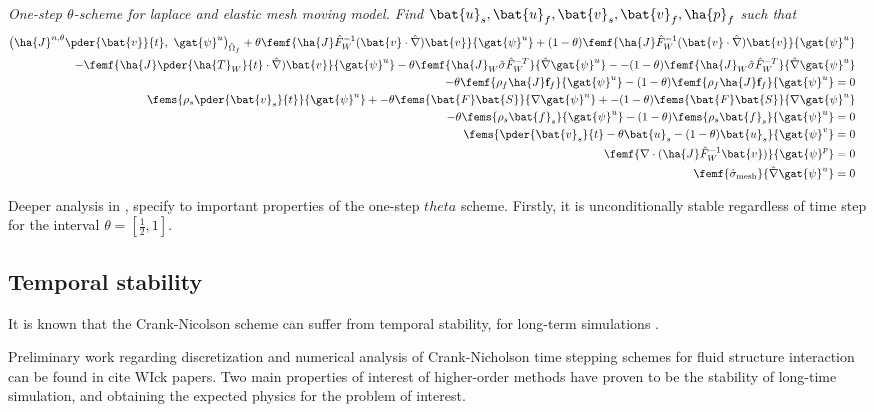 \begin{prob}
\textit{One-step $\theta$-scheme for laplace and elastic mesh moving model.
Find $\bat{u}_s, \bat{u}_f, \bat{v}_s, \bat{v}_f, \ha{p}_f $ such that}
\begin{align*}
\big(\ha{J}^{n, \theta} \pder{\bat{v}}{t}, \ \gat{\psi}^u \big)_{\hat{\Omega}_f} +
\theta \femf{\ha{J} \hat{F}_W^{-1}(\bat{v} \cdot \hat{\nabla}) \bat{v}}
{\gat{\psi}^u} + 
(1 - \theta) \femf{\ha{J} \hat{F}_W^{-1}(\bat{v} \cdot \hat{\nabla}) \bat{v}}
{\gat{\psi}^u} \\
- \femf{\ha{J}  \pder{\ha{T}_W}{t} \cdot \hat{\nabla}) \bat{v}}
{\gat{\psi}^u}
-\theta \femf{\ha{J}_W \hat{\sigma}\hat{F}_W^{-T}}{\hat{\nabla}\gat{\psi}^u} -
- (1 - \theta) \femf{\ha{J}_W \hat{\sigma}\hat{F}_W^{-T}}{\hat{\nabla}\gat{\psi}^u} \\
- \theta \femf{\rho_f \ha{J} \mathbf{f}_f}{{\gat{\psi}^u}} - 
(1 - \theta) \femf{\rho_f \ha{J} \mathbf{f}_f}{{\gat{\psi}^u}}= 0& \\
\fems{\rho_s \pder{\bat{v}_s}{t}}{\gat{\psi}^u} + 
- \theta\fems{\bat{F}\bat{S}}{\nabla \gat{\psi}^u}  + 
- (1 - \theta) \fems{\bat{F}\bat{S}}{\nabla \gat{\psi}^u} \\
- \theta \fems{\rho_s \bat{f}_s}{\gat{\psi}^u} 
- (1 - \theta) \fems{\rho_s \bat{f}_s}{\gat{\psi}^u} = 0 \\
\fems{\pder{\bat{v}_s}{t} - \theta \bat{u}_s - (1 - \theta)\bat{u}_s}{\gat{\psi}^v}  = 0&\\
\femf{\nabla \cdot (\ha{J} \hat{F}_W^{-1} \bat{v})}{\gat{\psi}^p} = 0& \\
\femf{\hat{\sigma}_{\text{mesh}}}{\hat{\nabla}\gat{\psi}^u} = 0&
\end{align*} 
\end{prob}

Deeper analysis in  \cite{Wicka}, specify to important properties of the one-step $theta$ scheme. Firstly, it is unconditionally stable regardless of time step for the interval $\theta = [\frac{1}{2}, 1]$. 

\subsection{Temporal stability}
It is known that the Crank-Nicolson scheme can suffer from temporal stability, for long-term simulations \cite{Wick2013a}.

Preliminary work regarding discretization and numerical analysis of Crank-Nicholson time stepping schemes for fluid structure interaction can be found in cite WIck papers. Two main properties of interest of higher-order methods have proven to be the stability of long-time simulation, and obtaining the expected physics for the problem of interest.

